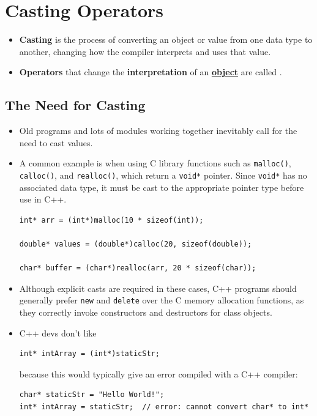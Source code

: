 \documentclass[10pt]{article}
\newcommand{\pbreak}{\vspace{30pt}}
\newcommand{\vocab}[1]{\fbox{\textbf{\textit{#1}}}}
\begin{document}
\newpage

\section{Casting Operators}
\begin{itemize}
\item \textbf{Casting} is the process of converting an object or value from one data type to another, changing how the compiler interprets and uses that value.

\item \textbf{Operators} that change the \textbf{interpretation} of an \underline{\textbf{object}} are called \vocab{casting operators}.
\end{itemize}

\pbreak

\subsection{The Need for Casting}
\begin{itemize}
    \item Old programs and lots of modules working together inevitably call for the need to cast values.

    \item A common example is when using C library functions such as \verb|malloc()|, \verb|calloc()|, and \verb|realloc()|, which return a \verb|void*| pointer. Since \verb|void*| has no associated data type, it must be cast to the appropriate pointer type before use in C++.

\begin{verbatim}
int* arr = (int*)malloc(10 * sizeof(int));

double* values = (double*)calloc(20, sizeof(double));

char* buffer = (char*)realloc(arr, 20 * sizeof(char));
\end{verbatim}

    \item Although explicit casts are required in these cases, C++ programs should generally prefer \verb|new| and \verb|delete| over the C memory allocation functions, as they correctly invoke constructors and destructors for class objects.

	\item C++ devs don't like
		\begin{verbatim}
int* intArray = (int*)staticStr;
		\end{verbatim}

	because this would typically give an error compiled with a C++ compiler:

	\begin{verbatim}
char* staticStr = "Hello World!";
int* intArray = staticStr;	// error: cannot convert char* to int*
	\end{verbatim}
\end{itemize}
\end{document}

